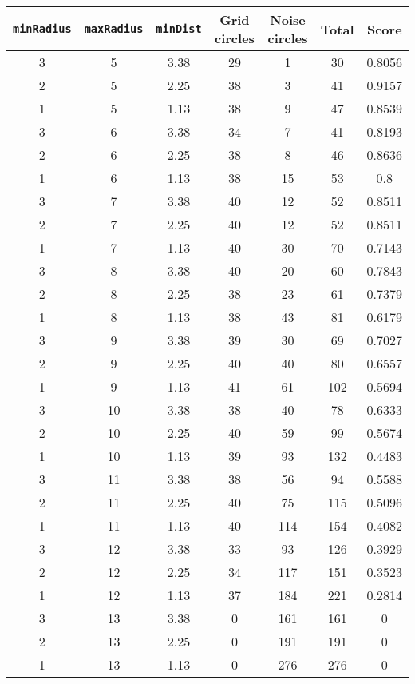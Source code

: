 \documentclass[letterpaper, 12pt]{article}
\begin{document}
\begin{longtable}{|c|c|c|c|c|c|c|}
\hline
\textbf{\texttt{minRadius}} & \textbf{\texttt{maxRadius}} & \textbf{\texttt{minDist}} & \textbf{Grid circles} & \textbf{Noise circles} & \textbf{Total} & \textbf{Score} \\
\hline
3 & 5 & 3.38 & 29 & 1 & 30 & 0.8056 \\
\hline
2 & 5 & 2.25 & 38 & 3 & 41 & 0.9157 \\
\hline
1 & 5 & 1.13 & 38 & 9 & 47 & 0.8539 \\
\hline
3 & 6 & 3.38 & 34 & 7 & 41 & 0.8193 \\
\hline
2 & 6 & 2.25 & 38 & 8 & 46 & 0.8636 \\
\hline
1 & 6 & 1.13 & 38 & 15 & 53 & 0.8 \\
\hline
3 & 7 & 3.38 & 40 & 12 & 52 & 0.8511 \\
\hline
2 & 7 & 2.25 & 40 & 12 & 52 & 0.8511 \\
\hline
1 & 7 & 1.13 & 40 & 30 & 70 & 0.7143 \\
\hline
3 & 8 & 3.38 & 40 & 20 & 60 & 0.7843 \\
\hline
2 & 8 & 2.25 & 38 & 23 & 61 & 0.7379 \\
\hline
1 & 8 & 1.13 & 38 & 43 & 81 & 0.6179 \\
\hline
3 & 9 & 3.38 & 39 & 30 & 69 & 0.7027 \\
\hline
2 & 9 & 2.25 & 40 & 40 & 80 & 0.6557 \\
\hline
1 & 9 & 1.13 & 41 & 61 & 102 & 0.5694 \\
\hline
3 & 10 & 3.38 & 38 & 40 & 78 & 0.6333 \\
\hline
2 & 10 & 2.25 & 40 & 59 & 99 & 0.5674 \\
\hline
1 & 10 & 1.13 & 39 & 93 & 132 & 0.4483 \\
\hline
3 & 11 & 3.38 & 38 & 56 & 94 & 0.5588 \\
\hline
2 & 11 & 2.25 & 40 & 75 & 115 & 0.5096 \\
\hline
1 & 11 & 1.13 & 40 & 114 & 154 & 0.4082 \\
\hline
3 & 12 & 3.38 & 33 & 93 & 126 & 0.3929 \\
\hline
2 & 12 & 2.25 & 34 & 117 & 151 & 0.3523 \\
\hline
1 & 12 & 1.13 & 37 & 184 & 221 & 0.2814 \\
\hline
3 & 13 & 3.38 & 0 & 161 & 161 & 0 \\
\hline
2 & 13 & 2.25 & 0 & 191 & 191 & 0 \\
\hline
1 & 13 & 1.13 & 0 & 276 & 276 & 0 \\

\end{longtable}
\end{document}
